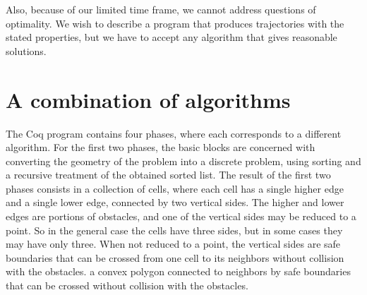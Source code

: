 \documentclass{llncs}
\begin{document}
Also, because of our limited time frame, we cannot address
questions of optimality.  We wish to describe a program that produces
trajectories with the stated properties, but we have to accept any
algorithm that gives reasonable solutions.
\section{A combination of algorithms}
The Coq program contains four phases, where each corresponds to a
different algorithm.  For the first two phases, the basic blocks are
concerned with converting the geometry of the problem into a discrete
problem, using sorting and a recursive treatment of the obtained
sorted list.  The result of the first two phases consists in a
collection of cells, where each cell has a single higher edge and a single
lower edge, connected by two vertical sides.  The higher and lower
edges are portions of obstacles, and one of the vertical sides may be
reduced to a point.  So in the general case the cells have three
sides, but in some cases they may have only three.  When not reduced
to a point, the vertical sides are safe boundaries that can be crossed
from one cell to its neighbors without collision with the
obstacles.  a convex polygon connected to neighbors by safe boundaries
that can be crossed without collision with the obstacles.
\end{document}
